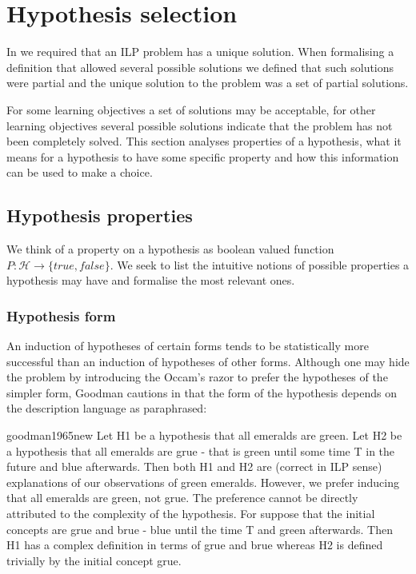 \section{Hypothesis selection}
In  we required that an ILP problem has a unique solution. When formalising a definition that allowed several possible solutions we defined that such solutions were partial and the unique solution to the problem was a set of partial solutions.

For some learning objectives a set of solutions may be acceptable, for other learning objectives several possible solutions indicate that the problem has not been completely solved. This section analyses properties of a hypothesis, what it means for a hypothesis to have some specific property and how this information can be used to make a choice.

\subsection{Hypothesis properties}
We think of a property on a hypothesis as boolean valued function
$P:\mathcal{H} \to \{true, false\}$. We seek to list the intuitive notions of possible properties a hypothesis may have and formalise the most relevant ones.

\subsubsection{Hypothesis form}
An induction of hypotheses of certain forms tends to be statistically more successful than an induction of hypotheses of other forms.
Although one may hide the problem by introducing the Occam's razor to prefer the hypotheses of the simpler form, Goodman cautions in \cite{goodman1965new} that the form of the hypothesis depends on the description language as paraphrased:

\begin{cite}{goodman1965new}
Let H1 be a hypothesis that all emeralds are green. Let H2 be a hypothesis that all emeralds are grue - that is green until some time T in the future and blue afterwards. Then both H1 and H2 are (correct in ILP sense) explanations of our observations of green emeralds. However, we prefer inducing that all emeralds are green, not grue. The preference cannot be directly attributed to the complexity of the hypothesis. For suppose that the initial concepts are grue and brue - blue until the time T and green afterwards. Then H1 has a complex definition in terms of grue and brue whereas H2 is defined trivially by the initial concept grue.
\end{cite}

